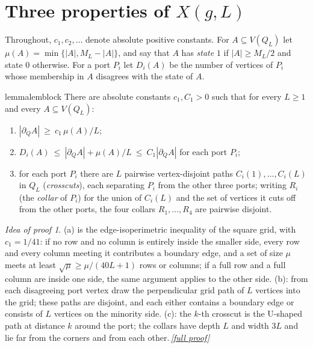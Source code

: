 \documentclass[11pt,a4paper]{article}
\theoremstyle{plain}
\theoremstyle{definition}
\theoremstyle{remark}
\newtheorem*{proofidea}{Idea of proof}
\newcommand{\fullproofref}[1]{\,\hyperref[#1]{\textit{[full proof]}}}
\begin{document}
\section{Three properties of $X(g,L)$}\label{sec:properties}

Throughout, $c_1,c_2,\dots$ denote absolute positive constants. For $A\subseteq V(Q_L)$ let $\mu(A)=\min\{|A|,M_L-|A|\}$, and say that $A$ has \emph{state} $1$ if $|A|\ge M_L/2$ and state $0$ otherwise. For a port $P_i$ let $D_i(A)$ be the number of vertices of $P_i$ whose membership in $A$ disagrees with the state of $A$.

\begin{restatable}{lemma}{lemblock}\label{lem:block}
There are absolute constants $c_1,C_1>0$ such that for every $L\ge1$ and every $A\subseteq V(Q_L)$:
\begin{enumerate}[label=(\alph*),nosep]
\item $|\partial_Q A|\ \ge\ c_1\,\mu(A)/L$;
\item $D_i(A)\ \le\ |\partial_QA|+\mu(A)/L\ \le\ C_1|\partial_Q A|$ for each port $P_i$;
\item for each port $P_i$ there are $L$ pairwise vertex-disjoint paths $C_i(1),\dots,C_i(L)$ in $Q_L$ (\emph{crosscuts}), each separating $P_i$ from the other three ports; writing $R_i$ (the \emph{collar} of $P_i$) for the union of $C_i(L)$ and the set of vertices it cuts off from the other ports, the four collars $R_1,\dots,R_4$ are pairwise disjoint.
\end{enumerate}
\end{restatable}
\begin{proofidea}
(a) is the edge-isoperimetric inequality of the square grid, with $c_1=1/41$: if no row and no column is entirely inside the smaller side, every row and every column meeting it contributes a boundary edge, and a set of size $\mu$ meets at least $\sqrt\mu\ge\mu/(40L+1)$ rows or columns; if a full row and a full column are inside one side, the same argument applies to the other side. (b): from each disagreeing port vertex draw the perpendicular grid path of $L$ vertices into the grid; these paths are disjoint, and each either contains a boundary edge or consists of $L$ vertices on the minority side. (c): the $k$-th crosscut is the U-shaped path at distance $k$ around the port; the collars have depth $L$ and width $3L$ and lie far from the corners and from each other.\fullproofref{pf:block}
\end{proofidea}
\end{document}
